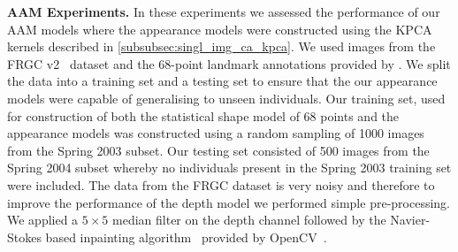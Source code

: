 \textbf{AAM Experiments.} In these experiments we assessed the performance
of our AAM models where the appearance models were constructed using the KPCA
kernels described in \cref{subsubsec:singl_img_ca_kpca}. We used images from
the FRGC v2~\cite{phillips2005overview} dataset and the 68-point landmark
annotations provided by \citet{sagonas2013semi}. We split the data into
a training set and a testing set to ensure that the our appearance models
were capable of generalising to unseen individuals. Our training set, used
for construction of both the statistical shape model of 68 points and the
appearance models was constructed using a random sampling of 1000 images
from the Spring 2003 subset. Our testing set consisted of 500 images from the
Spring 2004 subset whereby no individuals present in the Spring 2003 training
set were included. The data from the FRGC dataset is very noisy and therefore
to improve the performance of the depth model we performed simple pre-processing.
We applied a $5\times5$ median filter on the depth channel followed by
the Navier-Stokes based inpainting algorithm~\cite{bertalmio2001navier} provided
by OpenCV~\cite{opencv_library}.

